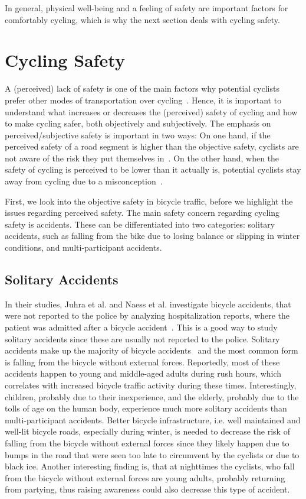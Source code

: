 In general, physical well-being and a feeling of safety are important factors for comfortably cycling, which is why the next section deals with cycling safety.
  

\section{Cycling Safety}
\label{sec:cycling_safety_background}
A (perceived) lack of safety is one of the main factors why potential cyclists prefer other modes of transportation over cycling~\cite{felix2020build,nazemi2021studying,lawson2013perception}.
Hence, it is important to understand what increases or decreases the (perceived) safety of cycling and how to make cycling safer, both objectively and subjectively.
The emphasis on perceived/subjective safety is important in two ways:
On one hand, if the perceived safety of a road segment is higher than the objective safety, cyclists are not aware of the risk they put themselves in~\cite{christ2023perceiving}.
On the other hand, when the safety of cycling is perceived to be lower than it actually is, potential cyclists stay away from cycling due to a misconception~\cite{noland1995perceived}.

First, we look into the objective safety in bicycle traffic, before we highlight the issues regarding perceived safety.
The main safety concern regarding cycling safety is accidents.
These can be differentiated into two categories:  solitary accidents, such as falling from the bike due to losing balance or slipping in winter conditions, and multi-participant accidents.

\subsection*{Solitary Accidents}
In their studies, Juhra et al. and Naess et al. investigate bicycle accidents, that were not reported to the police by analyzing hospitalization reports, where the patient was admitted after a bicycle accident~\cite{juhra2012bicycle,naess2020number}.
This is a good way to study solitary accidents since these are usually not reported to the police.
Solitary accidents make up the majority of bicycle accidents~\cite{juhra2012bicycle,naess2020number} and the most common form is falling from the bicycle without external forces.
Reportedly, most of these accidents happen to young and middle-aged adults during rush hours, which correlates with increased bicycle traffic activity during these times.
Interestingly, children, probably due to their inexperience, and the elderly, probably due to the tolls of age on the human body, experience much more solitary accidents than multi-participant accidents.
Better bicycle infrastructure, i.e. well maintained and well-lit bicycle roads, especially during winter, is needed to decrease the risk of falling from the bicycle without external forces since they likely happen due to bumps in the road that were seen too late to circumvent by the cyclists or due to black ice.
Another interesting finding is, that at nighttimes the cyclists, who fall from the bicycle without external forces are young adults, probably returning from partying, thus raising awareness could also decrease this type of accident.

